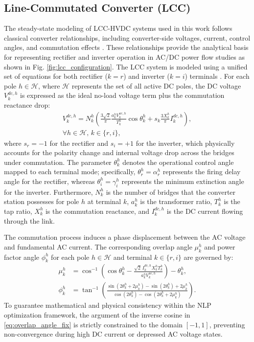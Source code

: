 \documentclass[letterpaper,journal]{IEEEtran}
\begin{document}
\subsection{Line-Commutated Converter (LCC)}
The steady-state modeling of LCC-HVDC systems used in this work follows classical converter relationships, including converter-side voltages,
current, control angles, and commutation effects \cite{ref13,ref14}. These relationships provide the analytical basis for representing rectifier
and inverter operation in AC/DC power flow studies as shown in Fig. \ref{fig:lcc_configuration}.
The LCC system is modeled using a unified set of equations for both rectifier ($k=r$) and inverter ($k=i$) terminals \cite{ref15}. For each
pole $h \in \mathcal{H}$, where $\mathcal{H}$ represents the set of all active DC poles, the DC voltage $V^{dc,h}_k$ is expressed as the ideal
no-load voltage term plus the commutation reactance drop:
\begin{align}
	\label{eq:vdc_universal}
	V^{dc,h}_k = N^h_k \left(\frac{3 \sqrt{2}}{\pi}\frac{a^h_k V^{ac,h}_k}{T^h_k} \cos{\theta^h_k} + s_k\frac{3 X^{h}_k}{\pi} I^{dc,h}_k\right), \nonumber \\
	\forall h \in \mathcal{H}, \, k \in \{r,i\},
\end{align}
where $s_r=-1$ for the rectifier and $s_i=+1$ for the inverter, which physically accounts for the polarity change and internal voltage drop across
the bridges under commutation. The parameter $\theta^h_k$ denotes the operational control angle mapped to each terminal mode;
specifically, $\theta^h_r = \alpha^h_r$ represents the firing delay angle for the rectifier, whereas $\theta^h_i = \gamma^h_i$ represents
the minimum extinction angle for the inverter. Furthermore, $N^h_k$ is the number of bridges that the converter station possesses for pole $h$
at terminal $k$, $a^h_k$ is the transformer ratio, $T^h_k$ is the tap ratio, $X^h_k$ is the commutation reactance, and $I^{dc,h}_k$ is the DC
current flowing through the link.

The commutation process induces a phase displacement between the AC voltage and fundamental AC current. The corresponding overlap angle $\mu^h_k$
and power factor angle $\phi^h_k$ for each pole $h \in \mathcal{H}$ and terminal $k \in \{r,i\}$ are governed by:
\begin{align}
	\label{eq:overlap_angle_fix}
	\mu^h_k  & = \cos^{-1}\left(\cos\theta^h_k-\frac{\sqrt{2}\,I^{dc,h}_k X^{h}_k T^h_k}{a^h_k V^{ac,h}_k}\right)-\theta^h_k, \\
	\label{eq:phi_angle_fix}
	\phi^h_k & = \tan^{-1}\left(
	\frac{\sin(2\theta^h_k+2\mu^h_k)-\sin(2\theta^h_k)+2\mu^h_k}
	{\cos(2\theta^h_k)-\cos(2\theta^h_k+2\mu^h_k)}
	\right).
\end{align}
To guarantee mathematical and physical consistency within the NLP optimization framework, the argument of the inverse cosine in
\eqref{eq:overlap_angle_fix} is strictly constrained to the domain $[-1, 1]$, preventing non-convergence during high DC current or depressed
AC voltage states.
\end{document}
